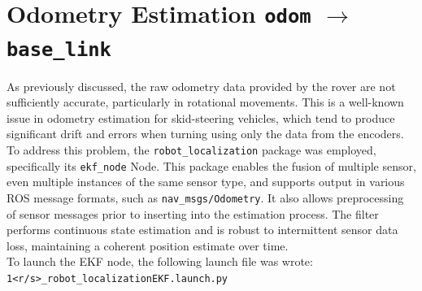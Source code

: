 \section{Odometry Estimation \texttt{odom} $\rightarrow$ \texttt{base\_link}}
As previously discussed, the raw odometry data provided by the rover are not sufficiently accurate, particularly in rotational movements\cite{MooreStouchKeneralizedEkf2014}. This is a well-known issue in odometry estimation for skid-steering vehicles, which tend to produce significant drift and errors when turning using only the data from the encoders.\\
To address this problem, the \texttt{robot\_localization} package\cite{MooreStouchKeneralizedEkf2014} was employed, specifically its \texttt{ekf\_node} Node.
This package enables the fusion of multiple sensor, even multiple instances of the same sensor type, and supports output in various ROS message formats, such as \texttt{nav\_msgs/Odometry}. It also allows preprocessing of sensor messages prior to inserting into the estimation process. The filter performs continuous state estimation and is robust to intermittent sensor data loss, maintaining a coherent position estimate over time.\\
To launch the EKF node, the following launch file was wrote:\\
\hspace*{10mm}\texttt{1<r/s>\_robot\_localizationEKF.launch.py}

